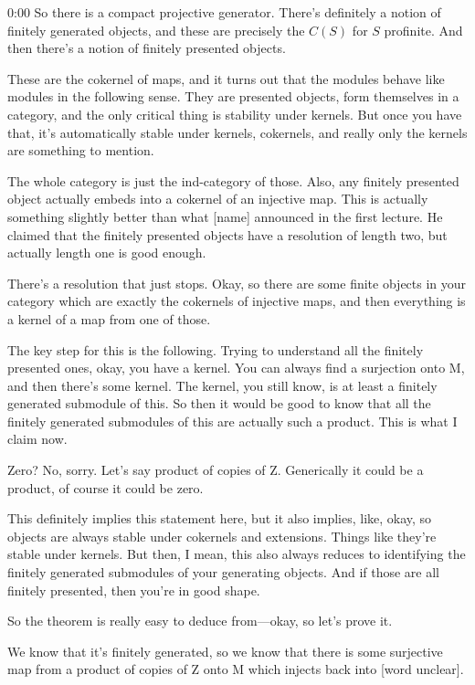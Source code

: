 \begin{unfinished}{0:00}
So there is a compact projective generator. There's definitely a notion of finitely generated objects, and these are precisely the $C(S)$ for $S$ profinite. And then there's a notion of finitely presented objects.

These are the cokernel of maps, and it turns out that the modules behave like modules in the following sense. They are presented objects, form themselves in a category, and the only critical thing is stability under kernels. But once you have that, it's automatically stable under kernels, cokernels, and really only the kernels are something to mention.

The whole category is just the ind-category of those. Also, any finitely presented object actually embeds into a cokernel of an injective map. This is actually something slightly better than what [name] announced in the first lecture. He claimed that the finitely presented objects have a resolution of length two, but actually length one is good enough.

There's a resolution that just stops. Okay, so there are some finite objects in your category which are exactly the cokernels of injective maps, and then everything is a kernel of a map from one of those.

The key step for this is the following. Trying to understand all the finitely presented ones, okay, you have a kernel. You can always find a surjection onto M, and then there's some kernel. The kernel, you still know, is at least a finitely generated submodule of this. So then it would be good to know that all the finitely generated submodules of this are actually such a product. This is what I claim now.

Zero? No, sorry. Let's say product of copies of Z. Generically it could be a product, of course it could be zero.

This definitely implies this statement here, but it also implies, like, okay, so objects are always stable under cokernels and extensions. Things like they're stable under kernels. But then, I mean, this also always reduces to identifying the finitely generated submodules of your generating objects. And if those are all finitely presented, then you're in good shape.

So the theorem is really easy to deduce from---okay, so let's prove it.

We know that it's finitely generated, so we know that there is some surjective map from a product of copies of Z onto M which injects back into [word unclear].


\end{unfinished}

